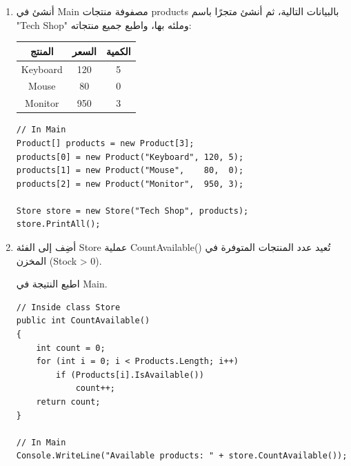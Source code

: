 \documentclass[14pt]{extarticle}
\begin{document}
\begin{enumerate}

\item
أنشئ في \textenglish{Main} مصفوفة منتجات \textenglish{products} بالبيانات التالية،
ثم أنشئ متجرًا باسم \textenglish{"Tech Shop"} وملئه بها، واطبع جميع منتجاته:

\begin{center}
\begin{tabular}{|c|c|c|}
\hline
\textbf{المنتج} & \textbf{السعر} & \textbf{الكمية} \\
\hline
\textenglish{Keyboard} & \textenglish{120} & \textenglish{5} \\
\textenglish{Mouse}    & \textenglish{80}  & \textenglish{0} \\
\textenglish{Monitor}  & \textenglish{950} & \textenglish{3} \\
\hline
\end{tabular}
\end{center}

\ifwithsols
\begin{boxSolution}
\begin{english}
{\small
\begin{verbatim}
// In Main
Product[] products = new Product[3];
products[0] = new Product("Keyboard", 120, 5);
products[1] = new Product("Mouse",    80,  0);
products[2] = new Product("Monitor",  950, 3);

Store store = new Store("Tech Shop", products);
store.PrintAll();
\end{verbatim}
}
\end{english}
\end{boxSolution}
\clearpage
\fi

\item
أضِف إلى الفئة \textenglish{Store} عملية \textenglish{CountAvailable()} تُعيد عدد
المنتجات المتوفرة في المخزن (\textenglish{Stock > 0}).

اطبع النتيجة في \textenglish{Main}.

\ifwithsols
\begin{boxSolution}
\begin{english}
{\small
\begin{verbatim}
// Inside class Store
public int CountAvailable()
{
    int count = 0;
    for (int i = 0; i < Products.Length; i++)
        if (Products[i].IsAvailable())
            count++;
    return count;
}

// In Main
Console.WriteLine("Available products: " + store.CountAvailable());
\end{verbatim}
}
\end{english}
\end{boxSolution}
\clearpage
\fi


\end{enumerate}
\end{document}
